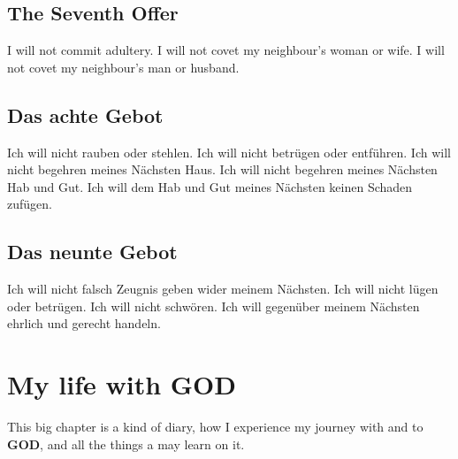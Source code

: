 \documentclass[12pt,a4paper]{article}
\newcommand{\God}[0]{\textbf{GOD}}
\newcommand{\Jesus}[0]{\textbf{JESUS}}
\newcommand{\q}[1]{\char"22{#1}\char"22 }
\begin{document}
	\subsection{The Seventh Offer}
		I will not commit adultery.
		I will not covet my neighbour's woman or wife.
		I will not covet my neighbour's man or husband.
		
	\subsection{Das achte Gebot}
		Ich will nicht rauben oder stehlen.
		Ich will nicht betr\"ugen oder entf\"uhren.
		Ich will nicht begehren meines N\"achsten Haus.
		Ich will nicht begehren meines N\"achsten Hab und Gut.
		Ich will dem Hab und Gut meines N\"achsten keinen Schaden zuf\"ugen.
		
	\subsection{Das neunte Gebot}
		Ich will nicht falsch Zeugnis geben wider meinem N\"achsten.
		Ich will nicht l\"ugen oder betr\"ugen.
		Ich will nicht schw\"oren.
		Ich will gegen\"uber meinem N\"achsten ehrlich und gerecht handeln.
		
%
	\section{My life with {\God}} \label{MeinLebenMitGott}
		This big chapter is a kind of diary,
		how I experience my journey with and to {\God},
		and all the things a may learn on it.
%	
\end{document}
